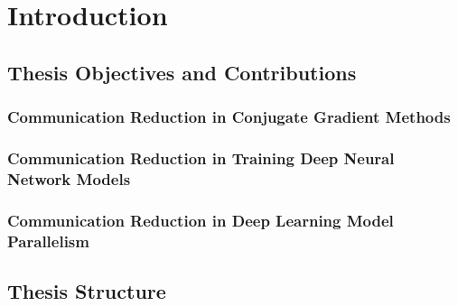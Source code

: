 
\chapter{Introduction}
\label{chap:introduction}
 
\section{Thesis Objectives and Contributions}

\subsection{Communication Reduction in Conjugate Gradient Methods}

\subsection{Communication Reduction in Training Deep Neural Network Models}

\subsection{Communication Reduction in Deep Learning Model Parallelism}


\section{Thesis Structure}
%

